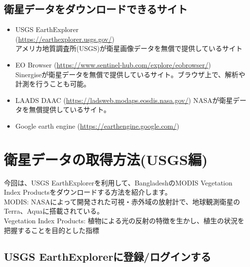 \documentclass[
]{book}
\begin{document}
\hypertarget{ux885bux661fux30c7ux30fcux30bfux3092ux30c0ux30a6ux30f3ux30edux30fcux30c9ux3067ux304dux308bux30b5ux30a4ux30c8}{%
\section{衛星データをダウンロードできるサイト}\label{ux885bux661fux30c7ux30fcux30bfux3092ux30c0ux30a6ux30f3ux30edux30fcux30c9ux3067ux304dux308bux30b5ux30a4ux30c8}}

\begin{itemize}
\item
  USGS EarthExplorer\\
  (\url{https://earthexplorer.usgs.gov/})\\
  アメリカ地質調査所(USGS)が衛星画像データを無償で提供しているサイト　　
\item
  EO Browser
  (\url{https://www.sentinel-hub.com/explore/eobrowser/})\\
  Sinergiseが衛星データを無償で提供しているサイト。ブラウザ上で、解析や計測を行うことも可能。
\item
  LAADS DAAC
  (\url{https://ladsweb.modaps.eosdis.nasa.gov/})
  NASAが衛星データを無償提供しているサイト。
\item
  Google earth engine
  (\url{https://earthengine.google.com/})
\end{itemize}

\hypertarget{ux885bux661fux30c7ux30fcux30bfux306eux53d6ux5f97ux65b9ux6cd5usgsux7de8}{%
\chapter{衛星データの取得方法(USGS編)}\label{ux885bux661fux30c7ux30fcux30bfux306eux53d6ux5f97ux65b9ux6cd5usgsux7de8}}

今回は、USGS EarthExplorerを利用して、BangladeshのMODIS Vegetation Index Productsをダウンロードする方法を紹介します。\\
MODIS: NASAによって開発された可視・赤外域の放射計で、地球観測衛星のTerra、Aquaに搭載されている。\\
Vegetation Index Products: 植物による光の反射の特徴を生かし、植生の状況を把握することを目的とした指標

\hypertarget{usgs-earthexplorerux306bux767bux9332ux30edux30b0ux30a4ux30f3ux3059ux308b}{%
\section{USGS EarthExplorerに登録/ログインする}\label{usgs-earthexplorerux306bux767bux9332ux30edux30b0ux30a4ux30f3ux3059ux308b}}
\end{document}
